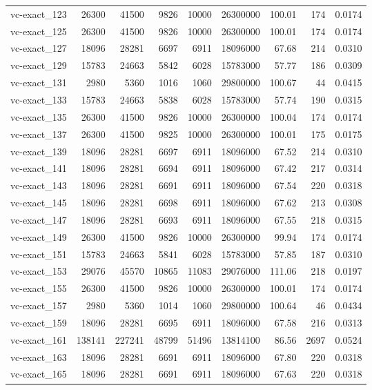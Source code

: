 {\begin{longtable}{lrrrrrrrr}
vc-exact\_123 & 26300 & 41500 & 9826 & 10000 & 26300000 & 100.01 & 174 & 0.0174 \\
vc-exact\_125 & 26300 & 41500 & 9826 & 10000 & 26300000 & 100.01 & 174 & 0.0174 \\
vc-exact\_127 & 18096 & 28281 & 6697 & 6911 & 18096000 & 67.68 & 214 & 0.0310 \\
vc-exact\_129 & 15783 & 24663 & 5842 & 6028 & 15783000 & 57.77 & 186 & 0.0309 \\
vc-exact\_131 & 2980 & 5360 & 1016 & 1060 & 29800000 & 100.67 & 44 & 0.0415 \\
vc-exact\_133 & 15783 & 24663 & 5838 & 6028 & 15783000 & 57.74 & 190 & 0.0315 \\
vc-exact\_135 & 26300 & 41500 & 9826 & 10000 & 26300000 & 100.04 & 174 & 0.0174 \\
vc-exact\_137 & 26300 & 41500 & 9825 & 10000 & 26300000 & 100.01 & 175 & 0.0175 \\
vc-exact\_139 & 18096 & 28281 & 6697 & 6911 & 18096000 & 67.52 & 214 & 0.0310 \\
vc-exact\_141 & 18096 & 28281 & 6694 & 6911 & 18096000 & 67.42 & 217 & 0.0314 \\
vc-exact\_143 & 18096 & 28281 & 6691 & 6911 & 18096000 & 67.54 & 220 & 0.0318 \\
vc-exact\_145 & 18096 & 28281 & 6698 & 6911 & 18096000 & 67.62 & 213 & 0.0308 \\
vc-exact\_147 & 18096 & 28281 & 6693 & 6911 & 18096000 & 67.55 & 218 & 0.0315 \\
vc-exact\_149 & 26300 & 41500 & 9826 & 10000 & 26300000 & 99.94 & 174 & 0.0174 \\
vc-exact\_151 & 15783 & 24663 & 5841 & 6028 & 15783000 & 57.85 & 187 & 0.0310 \\
vc-exact\_153 & 29076 & 45570 & 10865 & 11083 & 29076000 & 111.06 & 218 & 0.0197 \\
vc-exact\_155 & 26300 & 41500 & 9826 & 10000 & 26300000 & 100.01 & 174 & 0.0174 \\
vc-exact\_157 & 2980 & 5360 & 1014 & 1060 & 29800000 & 100.64 & 46 & 0.0434 \\
vc-exact\_159 & 18096 & 28281 & 6695 & 6911 & 18096000 & 67.58 & 216 & 0.0313 \\
vc-exact\_161 & 138141 & 227241 & 48799 & 51496 & 13814100 & 86.56 & 2697 & 0.0524 \\
vc-exact\_163 & 18096 & 28281 & 6691 & 6911 & 18096000 & 67.80 & 220 & 0.0318 \\
vc-exact\_165 & 18096 & 28281 & 6691 & 6911 & 18096000 & 67.63 & 220 & 0.0318 \\

\end{longtable}}
